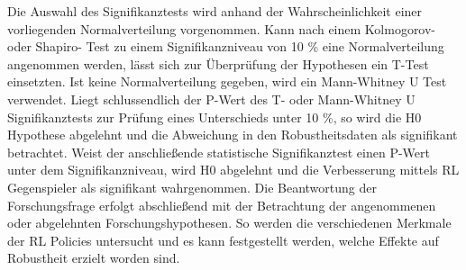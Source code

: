 Die Auswahl des Signifikanztests wird anhand der Wahrscheinlichkeit einer vorliegenden Normalverteilung vorgenommen.
Kann nach einem Kolmogorov- oder Shapiro- Test zu einem Signifikanzniveau von 10 \% eine Normalverteilung angenommen werden, lässt sich zur Überprüfung der Hypothesen ein T-Test einsetzten.
Ist keine Normalverteilung gegeben, wird ein Mann-Whitney U Test verwendet.
Liegt schlussendlich der P-Wert des T- oder Mann-Whitney U Signifikanztests zur Prüfung eines Unterschieds unter 10 \%, so wird die H0 Hypothese abgelehnt und die Abweichung in den Robustheitsdaten als signifikant betrachtet.
Weist der anschließende statistische Signifikanztest einen P-Wert unter dem Signifikanzniveau, wird H0 abgelehnt und die Verbesserung mittels RL Gegenspieler als signifikant wahrgenommen.
Die Beantwortung der Forschungsfrage erfolgt abschließend mit der Betrachtung der angenommenen oder abgelehnten Forschungshypothesen.
So werden die verschiedenen Merkmale der RL Policies untersucht und es kann festgestellt werden, welche Effekte auf Robustheit erzielt worden sind.
